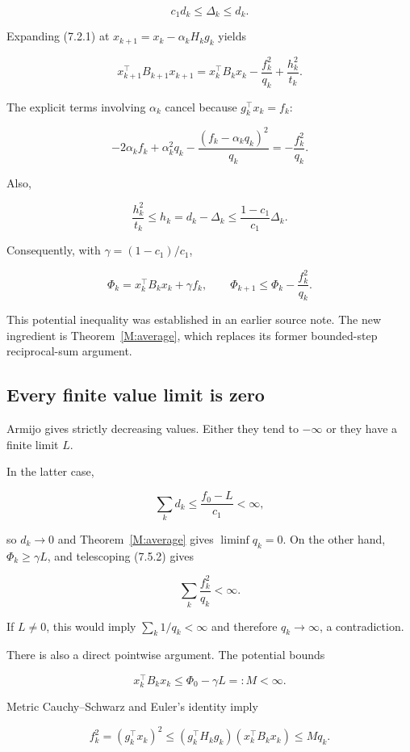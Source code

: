 \[
c_1d_k\le\Delta_k\le d_k.
\]

Expanding (7.2.1) at \(x_{k+1}=x_k-\alpha_kH_kg_k\) yields

\[
\boxed{
x_{k+1}^\top B_{k+1}x_{k+1}
=x_k^\top B_kx_k-\frac{f_k^2}{q_k}+\frac{h_k^2}{t_k}.
}
\tag{7.5.1}
\]

The explicit terms involving \(\alpha_k\) cancel because
\(g_k^\top x_k=f_k\):

\[
-2\alpha_k f_k+\alpha_k^2q_k
-\frac{(f_k-\alpha_kq_k)^2}{q_k}
=-\frac{f_k^2}{q_k}.
\]

Also,

\[
\frac{h_k^2}{t_k}\le h_k=d_k-\Delta_k
\le\frac{1-c_1}{c_1}\Delta_k.
\]

Consequently, with \(\gamma=(1-c_1)/c_1\),

\[
\Phi_k=x_k^\top B_kx_k+\gamma f_k,
\qquad
\boxed{\Phi_{k+1}\le\Phi_k-\frac{f_k^2}{q_k}.}
\tag{7.5.2}
\]

This potential inequality was established in an earlier source note. The new
ingredient is Theorem~\ref{M:average}, which replaces its former bounded-step
reciprocal-sum argument.



\subsection{Every finite value limit is
zero}\label{H:every-finite-value-limit-is-zero}

Armijo gives strictly decreasing values. Either they tend to \(-\infty\)
or they have a finite limit \(L\).

In the latter case,

\[
\sum_k d_k\le\frac{f_0-L}{c_1}<\infty,
\]

so \(d_k\to0\) and Theorem~\ref{M:average} gives \(\liminf q_k=0\). On the other hand,
\(\Phi_k\ge\gamma L\), and telescoping (7.5.2) gives

\[
\sum_k\frac{f_k^2}{q_k}<\infty.
\]

If \(L\ne0\), this would imply \(\sum_k1/q_k<\infty\) and therefore
\(q_k\to\infty\), a contradiction.

There is also a direct pointwise argument. The potential bounds

\[
x_k^\top B_kx_k\le\Phi_0-\gamma L=:M<\infty.
\]

Metric Cauchy--Schwarz and Euler's identity imply

\[
f_k^2=(g_k^\top x_k)^2
\le(g_k^\top H_kg_k)(x_k^\top B_kx_k)
\le Mq_k.
\]

